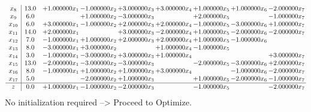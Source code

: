 \documentclass[10pt]{article}
\begin{document}
\[\begin{array}{c| c c@{\hskip 2pt} c@{\hskip 2pt} c@{\hskip 2pt} c@{\hskip 2pt} c@{\hskip 2pt} c@{\hskip 2pt} c@{\hskip 2pt} }
 x_{8}   &  13.0 & + 1.000000 x_{1} & -1.000000 x_{2} & + 3.000000 x_{3} & + 3.000000 x_{4} & + 1.000000 x_{5} & + 1.000000 x_{6} & -2.000000 x_{7}\\
 x_{9}   &  6.0  &   & + 1.000000 x_{2} & -3.000000 x_{3} &   & + 2.000000 x_{5} &   & -1.000000 x_{7}\\
 x_{10}   &  6.0 & + 3.000000 x_{1} & -1.000000 x_{2} & + 2.000000 x_{3} & + 2.000000 x_{4} & -1.000000 x_{5} & -3.000000 x_{6} & + 1.000000 x_{7}\\
 x_{11}   &  14.0 & + 2.000000 x_{1} &   & + 3.000000 x_{3} & -2.000000 x_{4} & + 1.000000 x_{5} & -2.000000 x_{6} & -2.000000 x_{7}\\
 x_{12}   &  7.0 & -1.000000 x_{1} & + 1.000000 x_{2} & + 2.000000 x_{3} & + 2.000000 x_{4} & + 1.000000 x_{5} & -1.000000 x_{6} &   \\
 x_{13}   &  8.0 & -3.000000 x_{1} & + 3.000000 x_{2} &   & + 1.000000 x_{4} & -1.000000 x_{5} &    &   \\
 x_{14}   &  3.0 & -1.000000 x_{1} & -3.000000 x_{2} & + 3.000000 x_{3} & + 1.000000 x_{4} &    &   & + 3.000000 x_{7}\\
 x_{15}   &  13.0 & -2.000000 x_{1} & -3.000000 x_{2} & -3.000000 x_{3} &   & -2.000000 x_{5} & -3.000000 x_{6} & + 2.000000 x_{7}\\
 x_{16}   &  8.0 & -1.000000 x_{1} & + 1.000000 x_{2} & + 1.000000 x_{3} & + 3.000000 x_{4} &   & -1.000000 x_{6} & -2.000000 x_{7}\\
 x_{17}   &  5.0  &   & -2.000000 x_{2} & + 1.000000 x_{3} &   & + 1.000000 x_{5} & -2.000000 x_{6} & -1.000000 x_{7}\\
\hline
z    &  0.0 & + 1.000000 x_{1} & -1.000000 x_{2} & -2.000000 x_{3} &   & -1.000000 x_{5} &   & -2.000000 x_{7}\\
\end{array}\]
No initialization required --> Proceed to Optimize. 
\end{document}
